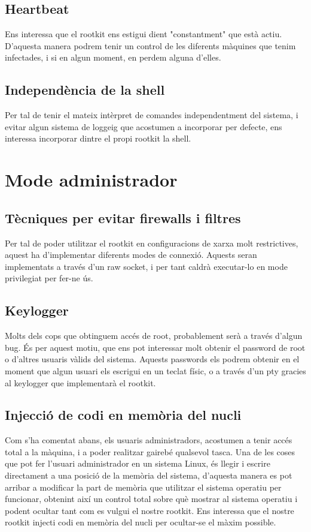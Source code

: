 \subsection{Heartbeat}
Ens interessa que el rootkit ens estigui dient "constantment" que està actiu. D'aquesta manera podrem tenir un control de les diferents
màquines que tenim infectades, i si en algun moment, en perdem alguna d'elles.

\subsection{Independència de la shell}
Per tal de tenir el mateix intèrpret de comandes independentment del sistema, i evitar algun sistema de loggeig que acostumen a 
incorporar per defecte, ens interessa incorporar dintre el propi rootkit la shell.

\section{Mode administrador}

\subsection{Tècniques per evitar firewalls i filtres}
Per tal de poder utilitzar el rootkit en configuracions de xarxa molt restrictives, aquest ha d'implementar diferents modes de connexió.
Aquests seran implementats a través d'un raw socket, i per tant caldrà executar-lo en mode privilegiat per fer-ne ús.

\subsection{Keylogger}
Molts dels cops que obtinguem accés de root, probablement serà a través d'algun bug. És per aquest motiu, que ens pot interessar molt
obtenir el password de root o d'altres usuaris vàlids del sistema. Aquests passwords els podrem obtenir en el moment que algun usuari
els escrigui en un teclat físic, o a través d'un pty gracies al keylogger que implementarà el rootkit.

\subsection{Injecció de codi en memòria del nucli}
Com s'ha comentat abans, els usuaris administradors, acostumen a tenir accés total a la màquina, i a poder realitzar gairebé qualsevol tasca.
Una de les coses que pot fer l'usuari administrador en un sistema Linux, és llegir i escrire directament a una posició de la
memòria del sistema, d'aquesta manera es pot arribar a modificar la part de memòria que utilitzar el sistema operatiu per funcionar,
obtenint així un control total sobre què mostrar al sistema operatiu i podent ocultar tant com es vulgui el nostre rootkit.
Ens interessa que el nostre rootkit injecti codi en memòria del nucli per ocultar-se el màxim possible.




